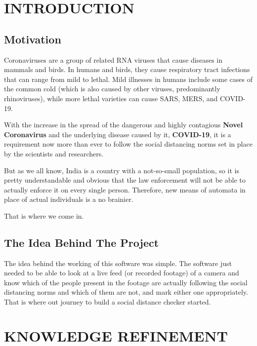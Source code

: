 \documentclass[a4paper]{article}
\begin{document}
\setcounter{page}{1}
\newpage
\setcounter{tocdepth}{2} %
\tableofcontents
\newpage

\setcounter{page}{1}

\section{INTRODUCTION}
\subsection{Motivation}
Coronaviruses are a group of related RNA viruses that cause diseases in mammals
and birds. In humans and birds, they cause respiratory tract infections that can
range from mild to lethal. Mild illnesses in humans include some cases of the
common cold (which is also caused by other viruses, predominantly rhinoviruses),
while more lethal varieties can cause SARS, MERS, and COVID-19.

With the increase in the spread of the dangerous and highly contagious \textbf{Novel Coronavirus}
and the underlying disease caused by it, \textbf{COVID-19},
it is a requirement now more than ever to follow the social distancing
norms set in place by the scientists and researchers.

But as we all know, India is a country with a not-so-small population,
so it is pretty understandable and obvious that the law enforcement will
not be able to actually enforce it on every single person. Therefore,
new means of automata in place of actual individuals is a no brainier.

That is where we come in.

\subsection{The Idea Behind The Project}
The idea behind the working of this software was simple. The software just needed
to be able to look at a live feed (or recorded footage) of a camera and know
which of the people present in the footage are actually following the social
distancing norms and which of them are not, and mark either one appropriately.
That is where out journey to build a social distance checker started.

\pagebreak

\section{KNOWLEDGE REFINEMENT}
\end{document}
